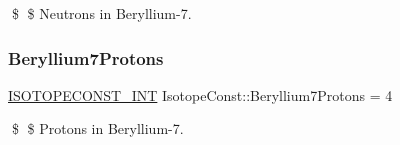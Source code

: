 \$ \$ Neutrons in Beryllium-\/7. \mbox{\label{group___isotope_const-_beryllium-_be7_ga08ddc8ad5341c77fc4d43bbd85a62518}} 
\subsubsection{\texorpdfstring{Beryllium7\+Protons}{Beryllium7Protons}}
{\footnotesize\ttfamily \mbox{\hyperlink{group___isotope_const-_macros_ga5f18360b3e99483a35c32d789e62621c}{I\+S\+O\+T\+O\+P\+E\+C\+O\+N\+S\+T\+\_\+\+I\+NT}} Isotope\+Const\+::\+Beryllium7\+Protons = 4}

\$ \$ Protons in Beryllium-\/7. 
